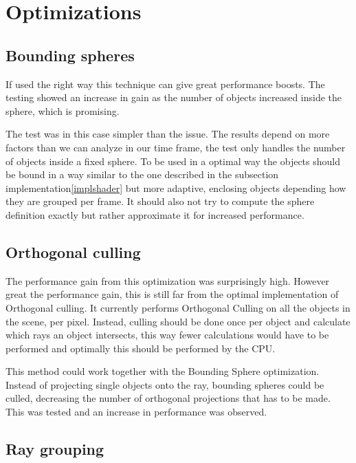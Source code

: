 	\section{Optimizations} \label{optimization}

		\subsection{Bounding spheres}

			If used the right way this technique can give great performance 
			boosts. The testing showed an increase in gain as the number of 
			objects increased inside the sphere, which is promising.

			The test was in this case simpler than the issue. The results depend on
			more factors than we can analyze in our time frame, the test only handles
			the number of objects inside a fixed sphere. To be used in a optimal way
			the objects should be bound in a way similar to the one described in the
			subsection implementation\ref{implshader} but more adaptive, enclosing
			objects depending how they are grouped per frame. It should also not try
			to compute the sphere definition exactly but rather approximate it 
			for
			increased performance. 

		\subsection{Orthogonal culling}

			The performance gain from this optimization was surprisingly high.
			However great the performance gain, this is still far from the optimal
			implementation of Orthogonal culling.  It currently performs Orthogonal
			Culling on all the objects in the scene, per pixel.  Instead, culling
			should be done once per object and calculate which rays an object
			intersects, this way fewer calculations would have to be performed and
			optimally this should be performed by the CPU. 

			This method could work together with the Bounding Sphere
			optimization. Instead of projecting single objects onto the ray,
			bounding spheres could be culled, decreasing the number of
			orthogonal projections that has to be made. This was tested and
			an increase in performance was observed.
			
		\subsection{Ray grouping}

